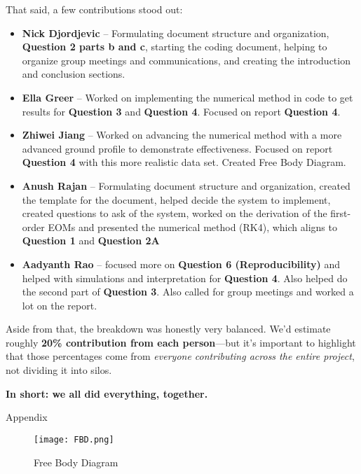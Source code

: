 \documentclass[12pt,letterpaper, onecolumn]{exam}
\begin{document}
\begin{questions}
\begin{solution}
        That said, a few contributions stood out:
        \begin{itemize}
        \item \textbf{Nick Djordjevic} – Formulating document structure and organization, \textbf{Question 2 parts b and c}, starting the coding document, helping to organize group meetings and communications, and creating the introduction and conclusion sections.
        \item \textbf{Ella Greer} – Worked on implementing the numerical method in code to get results for \textbf{Question 3} and \textbf{Question 4}. Focused on report \textbf{Question 4}.
        \item \textbf{Zhiwei Jiang} – Worked on advancing the numerical method with a more advanced ground profile to demonstrate effectiveness. Focused on report \textbf{Question 4} with this more realistic data set. Created Free Body Diagram.
        \item \textbf{Anush Rajan} – Formulating document structure and organization, created the template for the document, helped decide the system to implement, created questions to ask of the system, worked on the derivation of the first-order EOMs and presented the numerical method (RK4), which aligns to \textbf{Question 1} and \textbf{Question 2A}
        \item \textbf{Aadyanth Rao} – focused more on \textbf{Question 6 (Reproducibility)} and helped with simulations and interpretation for \textbf{Question 4}. Also helped do the second part of \textbf{Question 3}. Also called for group meetings and worked a lot on the report. 
        \end{itemize}

        Aside from that, the breakdown was honestly very balanced. We’d estimate roughly \textbf{20\% contribution from each person}—but it’s important to highlight that those percentages come from \textit{everyone contributing across the entire project}, not dividing it into silos.

        \textbf{In short: we all did everything, together.}
        \end{solution}

\newpage

\FloatBarrier
\question[] Appendix \droppoints

\begin{figure}[h!]
    \centering
    \texttt{[image: FBD.png]}
    \caption{Free Body Diagram}
    \label{fig:FBD}
\end{figure}


\end{questions}
\end{document}
